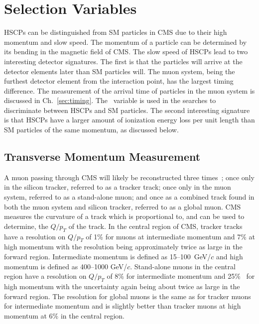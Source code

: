 \section{Selection Variables \label{sec:SelVar}}
HSCPs can be distinguished from SM particles in CMS due to their high momentum and slow speed.
The momentum of a particle can be determined by its bending in the magnetic field of CMS.
The slow speed of HSCPs lead to two interesting detector signatures. The first is that the particles will arrive at the detector elements later than SM particles will.
The muon system, being the furthest detector element from the interaction point, has the largest timing difference. The measurement of the arrival time of particles in the
muon system is discussed in Ch.~\ref{sec:timing}. The \invbeta\ variable is used in the searches to discriminate between HSCPs and SM particles.
The second interesting signature is that HSCPs have a larger amount of ionization energy loss per unit length 
than SM particles of the same momentum, as discussed below.

\subsection{Transverse Momentum Measurement \label{sec:PMeasurement}}
A muon passing through CMS will likely be reconstructed three times~\cite{2012JInst...7P0002T}; once only in the silicon tracker, referred to as a tracker track;
once only in the muon system, referred to as a stand-alone muon; and once as a combined track found in both the muon system and silicon tracker, referred
to as a global muon. CMS measures the curvature of a track which is proportional to, and can be used to determine, the $Q/p_T$ of the track.
In the central region of CMS, tracker tracks have a resolution on $Q/p_T$ of 1\% for muons at intermediate momentum and 7\% at
high momentum with the resolution being approximately
twice as large in the forward region. Intermediate momentum is defined as 15--100~GeV/$c$ and high momentum is defined as 400--1000 GeV/$c$.
Stand-alone muons in the central region have a resolution on $Q/p_T$ of 8\% for intermediate momentum and 25\%~\cite{2008AN097} for high momentum with the uncertainty again
being about twice as large in the forward region. The resolution for global muons is the same as for tracker muons for intermediate momentum and is slightly better
than tracker muons at high momentum at 6\% in the central region.

